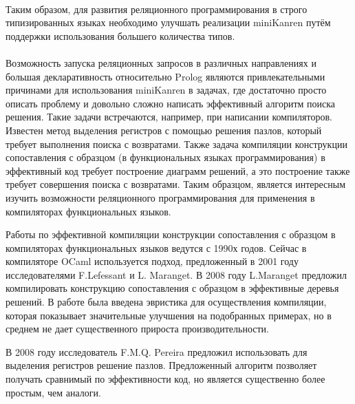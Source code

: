 \paragraph{} Таким образом, для развития реляционного программирования в строго типизированных языках необходимо улучшать реализации miniKanren путём поддержки использования большего количества типов. 

\paragraph{} Возможность запуска реляционных запросов в различных направлениях и большая декларативность относительно Prolog являются привлекательными причинами для использования miniKanren в задачах, где достаточно просто описать проблему и довольно сложно написать эффективный алгоритм поиска решения. Такие задачи встречаются, например, при написании компиляторов. Известен метод выделения регистров с помощью решения пазлов, который требует выполнения поиска с возвратами. Также задача компиляции конструкции сопоставления с образцом  (в функциональных языках программирования) в эффективный код требует построение диаграмм решений, а это построение также требует совершения поиска с возвратами. Таким образцом, является интересным изучить возможности реляционного программирования для применения в компиляторах функциональных языков.

{\progress}
Работы по эффективной компиляции конструкции сопоставления с образцом в компиляторах функциональных языков ведутся с 1990х годов. Сейчас в компиляторе OCaml используется подход, предложенный в 2001 году исследователями F.Lefessant и L. Maranget. В 2008 году L.Maranget предложил компилировать конструкцию сопоставления с образцом в эффективные деревья решений. В работе была введена эвристика для осуществления компиляции, которая показывает значительные улучшения на подобранных примерах, но в среднем не дает существенного прироста производительности.

В 2008 году исследователь F.M.Q. Pereira предложил использовать для выделения регистров решение пазлов. Предложенный алгоритм позволяет получать сравнимый по эффективности код, но является существенно более простым, чем аналоги.

